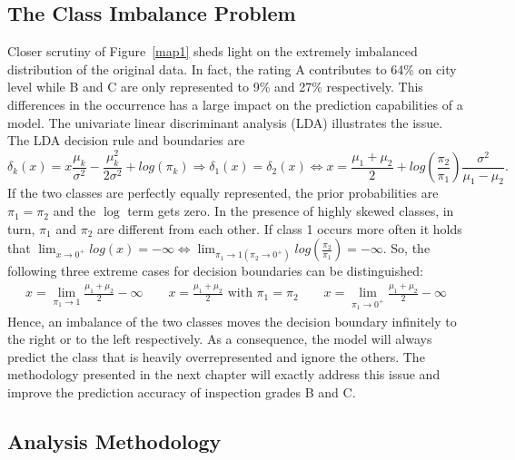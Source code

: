 \documentclass[11pt]{article}
\begin{document}
\subsection{The Class Imbalance Problem}\label{Imbalance Problem}
Closer scrutiny of Figure~\ref{map1} sheds light on the extremely imbalanced distribution of the original data. In fact, the rating A contributes to 64\% on city level while B and C are only represented to 9\% and 27\% respectively. This differences in the occurrence has a large impact on the prediction capabilities of a model. The univariate linear discriminant analysis (LDA) illustrates the issue. The LDA decision rule and boundaries are
\begin{equation*}\delta_{k}(x) = x \frac{\mu_{k}}{\sigma^{2}} - \frac{\mu_{k}^{2}}{2\sigma^{2}} + log(\pi_{k}) \Longrightarrow  \delta_{1}(x) = \delta_{2}(x) \Leftrightarrow x = \frac{\mu_{1} + \mu_{2}}{2} + log\left(\frac{\pi_2}{\pi_{1}}\right)\frac{\sigma^{2}}{\mu_{1} - \mu_{2}}.\end{equation*}
If the two classes are perfectly equally represented, the prior probabilities are $\pi_{1} = \pi_{2}$ and the $\log$ term gets zero. In the presence of highly skewed classes, in turn, $\pi_{1}$ and $\pi_{2}$ are different from each other. If class 1 occurs more often it holds that $\lim_{x \to 0^{+}}log(x) = -\infty \Leftrightarrow \lim_{\pi_{1} \to 1 (\pi_{2} \to 0^{+})}log(\frac{\pi_{2}}{\pi_{1}}) = -\infty$. So, the following three extreme cases for decision boundaries can be distinguished:
\begin{align*} x = \lim_{\pi_{1} \to 1} \frac{\mu_{1} + \mu_{2}}{2} -\infty \qquad  x = \frac{\mu_{1} + \mu_{2}}{2} \text{ with } \pi_1 = \pi_2 \qquad x = \lim_{\pi_{1} \to 0^{+}} \frac{\mu_{1} + \mu_{2}}{2} -\infty \end{align*}
Hence, an imbalance of the two classes moves the decision boundary infinitely to the right or to the left respectively. As a consequence, the model will always predict the class that is heavily overrepresented and ignore the others. The methodology presented in the next chapter will exactly address this issue and improve the prediction accuracy of inspection grades B and C.

\subsection{Analysis Methodology}
\end{document}
